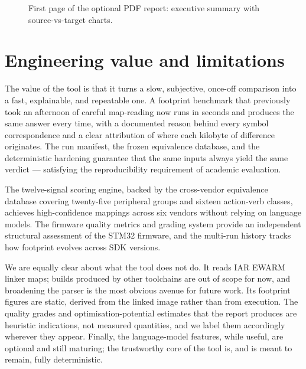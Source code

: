 \begin{figure}[H]
\centering
{}
\caption{First page of the optional PDF report: executive summary with source-vs-target charts.}
\label{fig:tool-pdf-report}
\end{figure}

\section{Engineering value and limitations}
\label{sec:tool-value}

The value of the tool is that it turns a slow, subjective, once-off comparison into a fast,
explainable, and repeatable one. A footprint benchmark that previously took an afternoon of
careful map-reading now runs in seconds and produces the same answer every time, with a
documented reason behind every symbol correspondence and a clear attribution of where each
kilobyte of difference originates. The run manifest, the frozen equivalence database, and the
deterministic hardening guarantee that the same inputs always yield the same verdict ---
satisfying the reproducibility requirement of academic evaluation.

The twelve-signal scoring engine, backed by the cross-vendor equivalence database covering
twenty-five peripheral groups and sixteen action-verb classes, achieves high-confidence
mappings across six vendors without relying on language models. The firmware quality metrics
and grading system provide an independent structural assessment of the STM32 firmware, and
the multi-run history tracks how footprint evolves across SDK versions.

We are equally clear about what the tool does not do. It reads IAR EWARM linker maps; builds
produced by other toolchains are out of scope for now, and broadening the parser is the most
obvious avenue for future work. Its footprint figures are static, derived from the linked image
rather than from execution. The quality grades and optimisation-potential estimates that the
report produces are heuristic indications, not measured quantities, and we label them
accordingly wherever they appear. Finally, the language-model features, while useful, are
optional and still maturing; the trustworthy core of the tool is, and is meant to remain, fully
deterministic.

